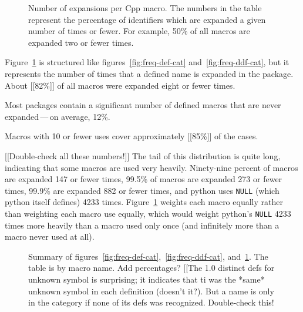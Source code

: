 \documentclass[10pt]{article}
\newcommand{\pkg}[1]{\textsf{#1}}
\begin{document}


\begin{figure}
\centerline{}
\caption{Number of expansions per Cpp macro.  The numbers in the
  table represent the percentage of identifiers which are expanded a given
  number of times or fewer.  For example, 50\% of all
  macros are expanded two or fewer times.}
\label{fig:freq-use-cat}
\end{figure}

Figure~\ref{fig:freq-use-cat} is structured like figures~\ref{fig:freq-def-cat} and~\ref{fig:freq-ddf-cat}, but it
represents the number of times that a defined name is expanded in 
the package.  About [[82\%]] of all macros were
expanded eight or fewer times.

Most packages contain a significant number of defined
macros that are never expanded\,---\,on average, 12\%.

Macros with 10 or fewer uses
cover approximately [[85\%]] of the cases.

[[Double-check all these numbers!]]
The tail of this distribution is quite long, indicating that some macros
are used very heavily.  Ninety-nine percent of macros are expanded 147 or fewer
times, 99.5\% of macros are expanded 273 or fewer times, 99.9\% are
expanded 882 or fewer times, and \pkg{python} uses {\tt NULL} (which \pkg{python}
itself defines) 4233 times.  Figure~\ref{fig:freq-use-cat} weights each macro
equally rather than weighting each macro use equally, which would weight
\pkg{python}'s {\tt NULL} 4233 times more heavily than a macro used only once
(and infinitely more than a macro never used at all).

\begin{figure}
  {\small\centerline{}}
  
  \caption{Summary of
    figures~\ref{fig:freq-def-cat},~\ref{fig:freq-ddf-cat},
    and~\ref{fig:freq-use-cat}.  The table is by macro name.  Add percentages?
    [[The 1.0 distinct defs for unknown symbol is surprising; it indicates
    that ti was the *same* unknown symbol in each definition (doesn't
    it?).  But a name is only in the category if none of its defs was
    recognized.  Double-check this!}
  \label{fig:freq-sum-cat}
\end{figure}
\end{document}
